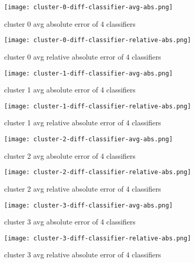 \begin{figure}
\centering
\begin{minipage}{.5\textwidth}
  \centering
  \texttt{[image: cluster-0-diff-classifier-avg-abs.png]}
  \caption{cluster 0 avg absolute error of 4 classifiers}
  \label{fig:cluster-0-predictors}
\end{minipage}%
\begin{minipage}{.5\textwidth}
  \centering
  \texttt{[image: cluster-0-diff-classifier-relative-abs.png]}
  \caption{cluster 0 avg relative absolute error of 4 classifiers}
\end{minipage}

\centering
\begin{minipage}{.5\textwidth}
  \centering
  \texttt{[image: cluster-1-diff-classifier-avg-abs.png]}
  \caption{cluster 1 avg absolute error of 4 classifiers}
  \label{fig:cluster-1-predictors}
\end{minipage}%
\begin{minipage}{.5\textwidth}
  \centering
  \texttt{[image: cluster-1-diff-classifier-relative-abs.png]}
  \caption{cluster 1 avg relative absolute error of 4 classifiers}
\end{minipage}

\end{figure}

\begin{figure}

\centering
\begin{minipage}{.5\textwidth}
  \centering
  \texttt{[image: cluster-2-diff-classifier-avg-abs.png]}
  \caption{cluster 2 avg absolute error of 4 classifiers}
  \label{fig:cluster-2-predictors}
\end{minipage}%
\begin{minipage}{.5\textwidth}
  \centering
  \texttt{[image: cluster-2-diff-classifier-relative-abs.png]}
  \caption{cluster 2 avg relative absolute error of 4 classifiers}
\end{minipage}

\centering
\begin{minipage}{.5\textwidth}
  \centering
  \texttt{[image: cluster-3-diff-classifier-avg-abs.png]}
  \caption{cluster 3 avg absolute error of 4 classifiers}
  \label{fig:cluster-3-predictors}
\end{minipage}%
\begin{minipage}{.5\textwidth}
  \centering
  \texttt{[image: cluster-3-diff-classifier-relative-abs.png]}
  \caption{cluster 3 avg relative absolute error of 4 classifiers}
\end{minipage}

\end{figure}

